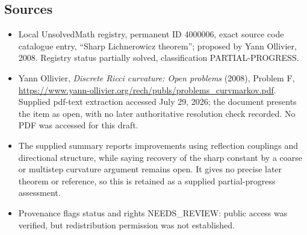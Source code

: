 \documentclass[11pt]{article}
\begin{document}
\subsection{Sources}
\begin{itemize}
\item Local UnsolvedMath registry, permanent ID 4000006, exact source code catalogue entry, ``Sharp Lichnerowicz theorem''; proposed by Yann Ollivier, 2008. Registry status partially solved, classification PARTIAL-PROGRESS.
\item Yann Ollivier, \emph{Discrete Ricci curvature: Open problems} (2008), Problem F, \url{https://www.yann-ollivier.org/rech/publs/problems_curvmarkov.pdf}. Supplied pdf-text extraction accessed July 29, 2026; the document presents the item as open, with no later authoritative resolution check recorded. No PDF was accessed for this draft.
\item The supplied summary reports improvements using reflection couplings and directional structure, while saying recovery of the sharp constant by a coarse or multistep curvature argument remains open. It gives no precise later theorem or reference, so this is retained as a supplied partial-progress assessment.
\item Provenance flags status and rights NEEDS\_REVIEW: public access was verified, but redistribution permission was not established.
\end{itemize}
\end{document}

